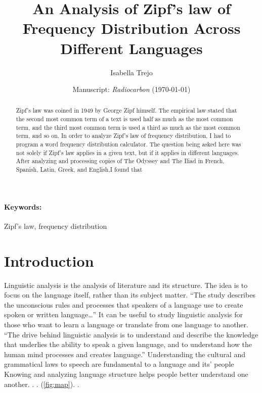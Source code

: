 \documentclass[a4paper,10pt]{article}
\title{An Analysis of Zipf's law of Frequency Distribution Across Different Languages}
\author{Isabella Trejo}
\date{\normalsize{Manuscript: \textit{Radiocarbon} (\today)}}
\begin{document}
\maketitle


\begin{abstract}
	Zipf’s law was coined in 1949 by George Zipf himself. The empirical law stated that the second most common term of a text is used half as much as the most common term, and the third most common term is used a third as much as the most common term, and so on. In order to analyze Zipf’s law of frequency distribution, I had to program a word frequency distribution calculator. The question being asked here was not solely if Zipf’s law applies in a given text, but if it applies in different languages. After analyzing and processing copies of The Odyssey and The Iliad in French, Spanish, Latin, Greek, and English,I found that  
\end{abstract}


\paragraph*{Keywords:} Zipf's law, frequency distribution

\section{Introduction}


Linguistic analysis is the analysis of literature and its structure. The idea is to focus on the language itself, rather than its subject matter. “The study describes the unconscious rules and processes that speakers of a language use to create spoken or written language…” It can be useful to study linguistic analysis for those who want to learn a language or translate from one language to another. “The drive behind linguistic analysis is to understand and describe the knowledge that underlies the ability to speak a given language, and to understand how the human mind processes and creates language.” Understanding the cultural and grammatical laws to speech are fundamental to a language and its’ people Knowing and analyzing language structure helps people better understand one another. \citep[e.g.,][]{Talamo2016,ConardETAL2004-Vogelherd-14C-humans,TrinkausETAL2005,DevieseETAL2017-14C-Vindija, DaviesETAL2015-trans-mosaic,StreetETAL2006-fossil-record}.  \citep[e.g.][]{FuETAL2014-Ust-Ishim,FuETAL2015-Oase}. (\autoref{fig:map}).   \citep[][p.75]{Kaminska2014-Slov-Pal-Meso}. 
\end{document}
